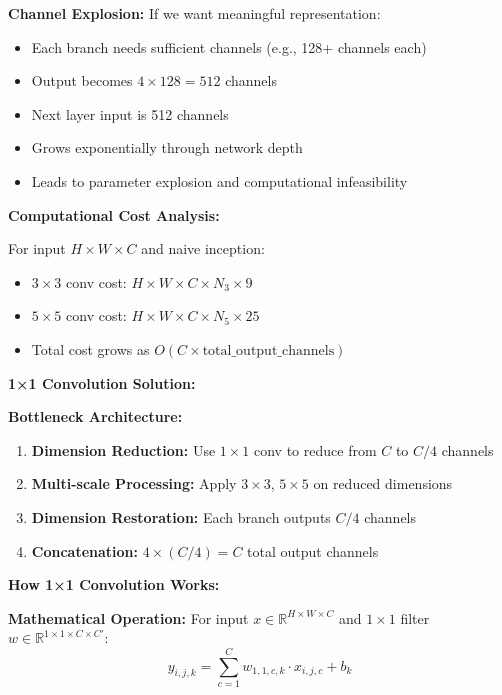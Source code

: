 \documentclass[12pt]{article}
\begin{document}
\begin{enumerate}[(a)]
{    \textbf{Channel Explosion:}
    If we want meaningful representation:
    \begin{itemize}
        \item Each branch needs sufficient channels (e.g., 128+ channels each)
        \item Output becomes $4 \times 128 = 512$ channels
        \item Next layer input is 512 channels
        \item Grows exponentially through network depth
        \item Leads to parameter explosion and computational infeasibility
    \end{itemize}
    
    \textbf{Computational Cost Analysis:}
    
    For input $H \times W \times C$ and naive inception:
    \begin{itemize}
        \item $3 \times 3$ conv cost: $H \times W \times C \times N_3 \times 9$
        \item $5 \times 5$ conv cost: $H \times W \times C \times N_5 \times 25$ 
        \item Total cost grows as $O(C \times \text{total\_output\_channels})$
    \end{itemize}
    
    \textbf{1×1 Convolution Solution:}
    
    \textbf{Bottleneck Architecture:}
    \begin{enumerate}
        \item \textbf{Dimension Reduction:} Use $1 \times 1$ conv to reduce from $C$ to $C/4$ channels
        \item \textbf{Multi-scale Processing:} Apply $3 \times 3$, $5 \times 5$ on reduced dimensions
        \item \textbf{Dimension Restoration:} Each branch outputs $C/4$ channels
        \item \textbf{Concatenation:} $4 \times (C/4) = C$ total output channels
    \end{enumerate}
    
    \textbf{How 1×1 Convolution Works:}
    
    \textbf{Mathematical Operation:}
    For input $x \in \mathbb{R}^{H \times W \times C}$ and $1 \times 1$ filter $w \in \mathbb{R}^{1 \times 1 \times C \times C'}$:
    $$y_{i,j,k} = \sum_{c=1}^C w_{1,1,c,k} \cdot x_{i,j,c} + b_k$$
    
}
\end{enumerate}
\end{document}
